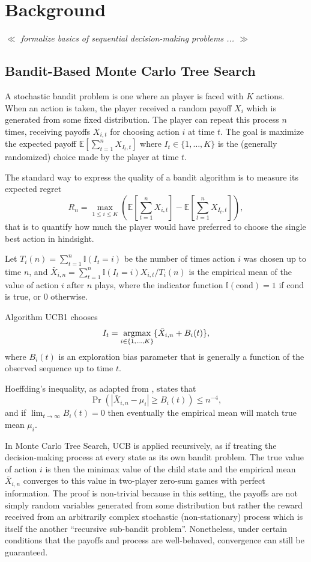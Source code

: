 \documentclass[runningheads,a4paper]{llncs}
\newcommand{\argmax}{\operatornamewithlimits{argmax}}
\newcommand{\bE}{\mathbb{E}}
\newcommand{\bI}{\mathbb{I}}
\newcommand{\toexpand}[1]{{\it $\ll$ #1 ... $\gg$ }}
\begin{document}
\section{Background}

\toexpand{formalize basics of sequential decision-making problems}

\subsection{Bandit-Based Monte Carlo Tree Search}
\label{sec:mcts}

A stochastic bandit problem is one where an player is faced with $K$ actions. When an action is taken, the player received a random 
payoff $X_i$ which is generated from some fixed distribution. 
The player can repeat this process $n$ times, receiving payoffs $X_{i,t}$ for choosing action $i$ at time $t$. The goal
is maximize the expected payoff $\bE[\sum_{t=1}^n X_{I_t,t}]$ where $I_t \in \{ 1, \ldots, K \}$ is the (generally randomized) choice 
made by the player at time $t$. 

The standard way to express the quality of a bandit algorithm is to measure its expected regret
\[
R_n = \max_{1 \le i \le K} \left( \bE \left[ \sum_{t=1}^n X_{i,t} \right] - \bE \left[ \sum_{t=1}^n X_{I_t,t} \right] \right), 
\]
that is to quantify how much the player would have preferred to choose the single best action in hindsight. 

Let $T_i(n) = \sum_{t = 1}^n \bI(I_t = i)$ be the number of times action $i$ was chosen up to time $n$, and 
$\bar{X}_{i,n} = \sum_{t = 1}^n \bI(I_t = i) X_{i,t} / T_i(n)$ is the empirical mean of the value of action $i$ 
after $n$ plays, where the indicator function $\bI(\mbox{cond}) = 1$ if cond is true, or 0 otherwise.

Algorithm UCB1 chooses 
\[
I_t = \argmax_{i \in \{1, \ldots, K\}} \{\bar{X}_{i,n} + B_i(t)\},
\]
where $B_i(t)$ is an exploration bias parameter that is generally a function of the observed sequence up to time $t$. 

Hoeffding's inequality, as adapted from \cite[Equations 3-4]{Kocsis06Bandit}, states that 
\[
\Pr(|\bar{X}_{i,n} - \mu_i| \ge B_i(t)) \le n^{-4},
\]
and if $\lim_{t \rightarrow \infty}B_i(t) = 0$ then eventually the empirical mean will match true mean $\mu_i$. 

In Monte Carlo Tree Search, UCB is applied recursively, as if treating the decision-making process at 
every state as its own bandit problem. 
The true value of action $i$ is then the minimax value of the child state and the empirical mean $\bar{X}_{i,n}$ 
converges to this value in two-player zero-sum games with perfect information. 
The proof is non-trivial because in this setting, the payoffs are not simply random variables generated from some 
distribution but rather the reward received from an arbitrarily complex stochastic (non-stationary) process which 
is itself the another ``recursive sub-bandit problem''. Nonetheless, under certain conditions that the payoffs 
and process are well-behaved, convergence can still be guaranteed. 
\end{document}
